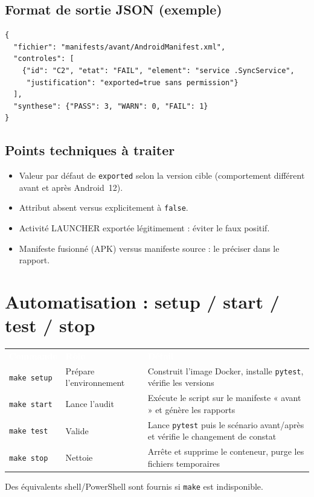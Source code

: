 \documentclass[11pt,a4paper]{article}
\newcommand{\code}[1]{{\NoAutoSpacing\texttt{\small #1}}}
\newcommand{\code}[1]{{\texttt{\small #1}}}
\newcommand{\hd}[1]{\textcolor{white}{\textbf{#1}}}
\begin{document}
\subsection{Format de sortie JSON (exemple)}
\begin{lstlisting}
{
  "fichier": "manifests/avant/AndroidManifest.xml",
  "controles": [
    {"id": "C2", "etat": "FAIL", "element": "service .SyncService",
     "justification": "exported=true sans permission"}
  ],
  "synthese": {"PASS": 3, "WARN": 0, "FAIL": 1}
}
\end{lstlisting}

\subsection{Points techniques à traiter}
\begin{itemize}
  \item Valeur par défaut de \code{exported} selon la version cible (comportement différent avant et après Android~12).
  \item Attribut absent versus explicitement à \code{false}.
  \item Activité LAUNCHER exportée légitimement : éviter le faux positif.
  \item Manifeste fusionné (APK) versus manifeste source : le préciser dans le rapport.
\end{itemize}

\section{Automatisation : setup / start / test / stop}
\begin{center}
\begin{tabular}{L{2.8cm}L{3.6cm}L{8.2cm}}
\hd{Commande} & \hd{Rôle} & \hd{Détail}\\
\code{make setup} & Prépare l'environnement & Construit l'image Docker, installe \code{pytest}, vérifie les versions\\
\code{make start} & Lance l'audit & Exécute le script sur le manifeste « avant » et génère les rapports\\
\code{make test} & Valide & Lance \code{pytest} puis le scénario avant/après et vérifie le changement de constat\\
\code{make stop} & Nettoie & Arrête et supprime le conteneur, purge les fichiers temporaires\\
\end{tabular}
\end{center}
Des équivalents shell/PowerShell sont fournis si \code{make} est indisponible.
\end{document}
